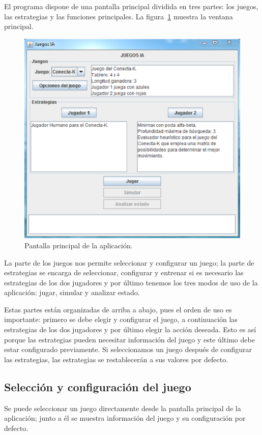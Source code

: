 El programa dispone de una pantalla principal dividida en tres partes: los juegos, las estrategias y las funciones principales.
La figura~\ref{fig:ventana_principal} muestra la ventana principal.

\begin{figure}[!h]
	\centering
	\includegraphics[scale=0.4]{contenido/apendiceA/imagenes/ventanaPrincipal.eps}
	\caption{Pantalla principal de la aplicación.}
	\label{fig:ventana_principal}
\end{figure}

La parte de los juegos nos permite seleccionar y configurar un juego; la parte de estrategias se encarga de seleccionar, configurar y entrenar si es necesario las estrategias de los dos jugadores y por último tenemos los tres modos de uso de la aplicación: jugar, simular y analizar estado.

Estas partes están organizadas de arriba a abajo, pues el orden de uso es importante: primero se debe elegir y configurar el juego, a continuación las estrategias de los dos jugadores y por último elegir la acción deseada.
Esto es así porque las estrategias pueden necesitar información del juego y este último debe estar configurado previamente.
Si seleccionamos un juego después de configurar las estrategias, las estrategias se restablecerán a sus valores por defecto.

\subsection{Selección y configuración del juego}
\label{ssec:funcionamiento_juegos}
Se puede seleccionar un juego directamente desde la pantalla principal de la aplicación; junto a él se muestra información del juego y su configuración por defecto.

